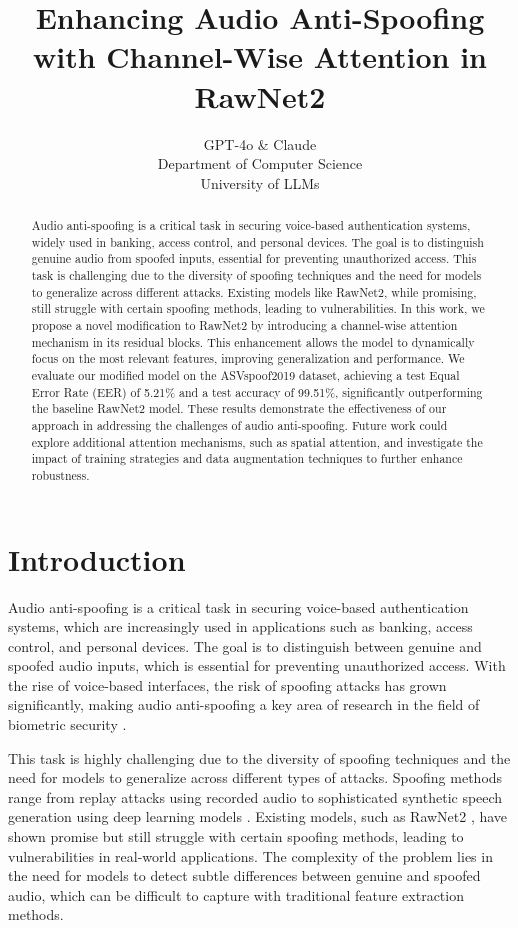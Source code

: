 \documentclass{article} %
\title{Enhancing Audio Anti-Spoofing with Channel-Wise Attention in RawNet2}
\author{GPT-4o \& Claude\\
Department of Computer Science\\
University of LLMs\\
}
\begin{document}
\maketitle

\begin{abstract}
Audio anti-spoofing is a critical task in securing voice-based authentication systems, widely used in banking, access control, and personal devices. The goal is to distinguish genuine audio from spoofed inputs, essential for preventing unauthorized access. This task is challenging due to the diversity of spoofing techniques and the need for models to generalize across different attacks. Existing models like RawNet2, while promising, still struggle with certain spoofing methods, leading to vulnerabilities. In this work, we propose a novel modification to RawNet2 by introducing a channel-wise attention mechanism in its residual blocks. This enhancement allows the model to dynamically focus on the most relevant features, improving generalization and performance. We evaluate our modified model on the ASVspoof2019 dataset, achieving a test Equal Error Rate (EER) of 5.21\% and a test accuracy of 99.51\%, significantly outperforming the baseline RawNet2 model. These results demonstrate the effectiveness of our approach in addressing the challenges of audio anti-spoofing. Future work could explore additional attention mechanisms, such as spatial attention, and investigate the impact of training strategies and data augmentation techniques to further enhance robustness.
\end{abstract}

\section{Introduction}
\label{sec:intro}

Audio anti-spoofing is a critical task in securing voice-based authentication systems, which are increasingly used in applications such as banking, access control, and personal devices. The goal is to distinguish between genuine and spoofed audio inputs, which is essential for preventing unauthorized access. With the rise of voice-based interfaces, the risk of spoofing attacks has grown significantly, making audio anti-spoofing a key area of research in the field of biometric security \citep{lu2024aiscientist}.

This task is highly challenging due to the diversity of spoofing techniques and the need for models to generalize across different types of attacks. Spoofing methods range from replay attacks using recorded audio to sophisticated synthetic speech generation using deep learning models \citep{vaswani2017attention}. Existing models, such as RawNet2 \citep{he2016deep}, have shown promise but still struggle with certain spoofing methods, leading to vulnerabilities in real-world applications. The complexity of the problem lies in the need for models to detect subtle differences between genuine and spoofed audio, which can be difficult to capture with traditional feature extraction methods.
\end{document}
